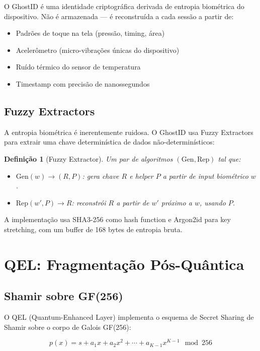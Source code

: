 \documentclass[12pt,a4paper,twoside]{book}
\newtheorem{definition}{Definição}[chapter]
\theoremstyle{remark}
\begin{document}
O GhostID é uma identidade criptográfica derivada de entropia biométrica do dispositivo. Não é armazenada — é reconstruída a cada sessão a partir de:

\begin{itemize}
    \item Padrões de toque na tela (pressão, timing, área)
    \item Acelerômetro (micro-vibrações únicas do dispositivo)
    \item Ruído térmico do sensor de temperatura
    \item Timestamp com precisão de nanossegundos
\end{itemize}

\section{Fuzzy Extractors}

A entropia biométrica é inerentemente ruidosa. O GhostID usa Fuzzy Extractors para extrair uma chave determinística de dados não-determinísticos:

\begin{definition}[Fuzzy Extractor]
Um par de algoritmos $(\text{Gen}, \text{Rep})$ tal que:
\begin{itemize}
    \item $\text{Gen}(w) \rightarrow (R, P)$: gera chave $R$ e helper $P$ a partir de input biométrico $w$.
    \item $\text{Rep}(w', P) \rightarrow R$: reconstrói $R$ a partir de $w'$ próximo a $w$, usando $P$.
\end{itemize}
\end{definition}

A implementação usa SHA3-256 como hash function e Argon2id para key stretching, com um buffer de 168 bytes de entropia bruta.

\chapter{QEL: Fragmentação Pós-Quântica}
\label{chap:qel}

\section{Shamir sobre GF(256)}

O QEL (Quantum-Enhanced Layer) implementa o esquema de Secret Sharing de Shamir sobre o corpo de Galois GF(256):

\begin{equation}
p(x) = s + a_1 x + a_2 x^2 + \cdots + a_{K-1} x^{K-1} \mod 256
\end{equation}
\end{document}
